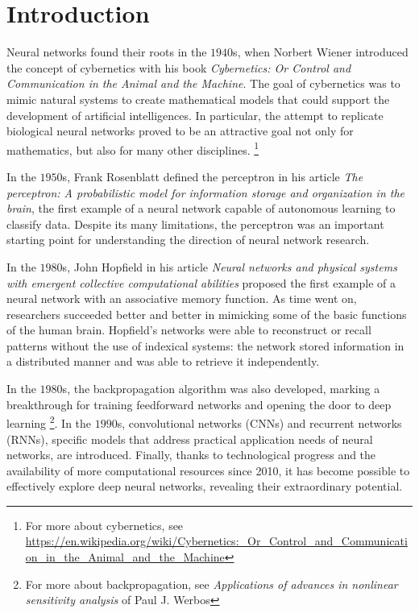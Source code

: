 \chapter{Introduction}
\label{ch:introduction}

Neural networks found their roots in the $1940$s, when Norbert Wiener introduced the concept of cybernetics with his book \textit{Cybernetics: Or Control and Communication in the Animal and the Machine}. The goal of cybernetics was to mimic natural systems to create mathematical models that could support the development of artificial intelligences. In particular, the attempt to replicate biological neural networks proved to be an attractive goal not only for mathematics, but also for many other disciplines. \footnote{For more about cybernetics, see \url{https://en.wikipedia.org/wiki/Cybernetics:_Or_Control_and_Communication_in_the_Animal_and_the_Machine}}

\noindent In the $1950$s, Frank Rosenblatt defined the perceptron in his article \textit{The perceptron: A probabilistic model for information storage and organization in the brain}, the first example of a neural network capable of autonomous learning to classify data. Despite its many limitations, the perceptron was an important starting point for understanding the direction of neural network research.

\noindent In the $1980$s, John Hopfield in his article \textit{Neural networks and physical systems with emergent collective computational abilities} proposed the first example of a neural network with an associative memory function. As time went on, researchers succeeded better and better in mimicking some of the basic functions of the human brain. Hopfield's networks were able to reconstruct or recall patterns without the use of indexical systems: the network stored information in a distributed manner and was able to retrieve it independently.

\noindent In the $1980$s, the backpropagation algorithm was also developed, marking a breakthrough for training feedforward networks and opening the door to deep learning \footnote{For more about backpropagation, see \textit{Applications of advances in nonlinear sensitivity analysis} of Paul J. Werbos}. In the $1990$s, convolutional networks (CNNs) and recurrent networks (RNNs), specific models that address practical application needs of neural networks, are introduced. Finally, thanks to technological progress and the availability of more computational resources since 2010, it has become possible to effectively explore deep neural networks, revealing their extraordinary potential.

